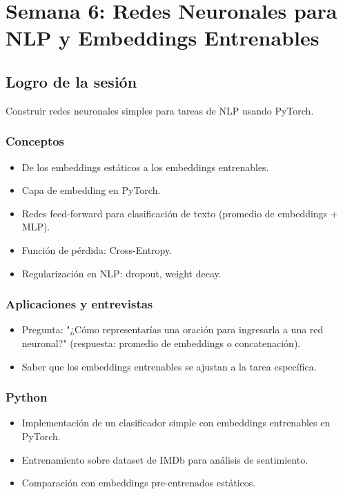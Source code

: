 \documentclass[12pt,a4paper,openany,oneside]{book}
\begin{document}
\chapter{Semana 6: Redes Neuronales para NLP y Embeddings Entrenables}

\section{Logro de la sesión}
Construir redes neuronales simples para tareas de NLP usando PyTorch.

\subsection{Conceptos}
\begin{itemize}
    \item De los embeddings estáticos a los embeddings entrenables.
    \item Capa de embedding en PyTorch.
    \item Redes feed-forward para clasificación de texto (promedio de embeddings + MLP).
    \item Función de pérdida: Cross-Entropy.
    \item Regularización en NLP: dropout, weight decay.
\end{itemize}

\subsection{Aplicaciones y entrevistas}
\begin{itemize}
    \item Pregunta: "¿Cómo representarías una oración para ingresarla a una red neuronal?" (respuesta: promedio de embeddings o concatenación).
    \item Saber que los embeddings entrenables se ajustan a la tarea específica.
\end{itemize}

\subsection{Python}
\begin{itemize}
    \item Implementación de un clasificador simple con embeddings entrenables en PyTorch.
    \item Entrenamiento sobre dataset de IMDb para análisis de sentimiento.
    \item Comparación con embeddings pre-entrenados estáticos.
\end{itemize}
\end{document}
